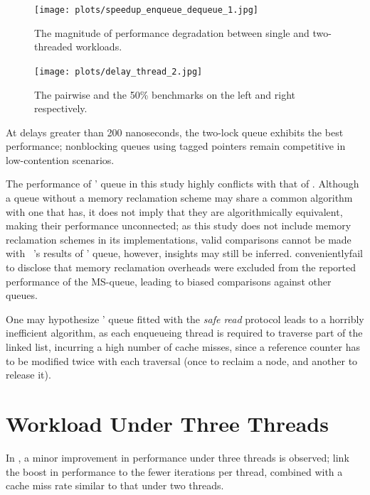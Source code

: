 \begin{figure}[!ht]
    \centering
    \texttt{[image: plots/speedup\_enqueue\_dequeue\_1.jpg]}
    \caption{The magnitude of performance degradation between single and two-threaded workloads.}
    \label{fig:perf_deg_1_thread}
\end{figure}

\begin{figure}[!ht]
    \centering
    \texttt{[image: plots/delay\_thread\_2.jpg]}
    \caption{The pairwise and the 50\% benchmarks on the left and right respectively.}
    \label{fig:perf_2_thread}
\end{figure}

At delays greater than 200 nanoseconds, the two-lock queue exhibits the best
performance; nonblocking queues using tagged pointers remain competitive in
low-contention scenarios. 

The performance of \citeauthor{valois1994queues}' queue in this study highly
conflicts with that of \citep{michael1996simple}. Although a queue without a
memory reclamation scheme may share a common algorithm with one that has, it
does not imply that they are algorithmically equivalent, making their
performance unconnected; as this study does not include memory reclamation
schemes in its implementations, valid comparisons cannot be made with
~\citep{michael1996simple}'s results of \citeauthor{valois1994queues}' queue,
however, insights may still be inferred.
\citeauthor{michael1996simple}\textemdash conveniently\textemdash fail to
disclose that memory reclamation overheads were excluded from the reported
performance of the MS-queue, leading to biased comparisons against other
queues.

One may hypothesize \citeauthor{valois1994queues}' queue fitted with the \emph{safe read}
protocol leads to a horribly inefficient algorithm, as each enqueueing thread
is required to traverse part of the linked list, incurring a high number of
cache misses, since a reference counter has to be modified twice with each
traversal (once to reclaim a node, and another to release it).

\section{Workload Under Three Threads}
In \citep{ladan2008optimistic,michael1996simple,hoffman2007baskets},
a minor improvement in performance under three threads is observed;
\citeauthor{michael1996simple} link the boost in performance to the fewer
iterations per thread, combined with a cache miss rate similar to that under
two threads.

